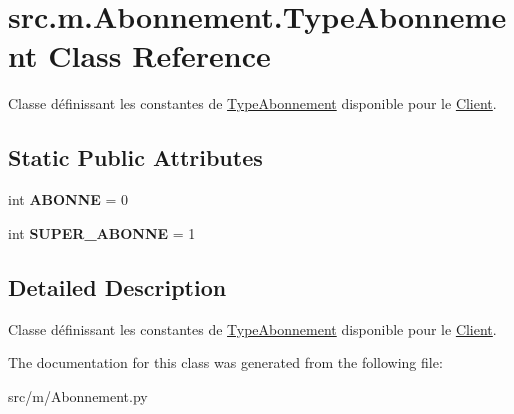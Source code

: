 \hypertarget{classsrc_1_1m_1_1_abonnement_1_1_type_abonnement}{}\section{src.\+m.\+Abonnement.\+Type\+Abonnement Class Reference}
\label{classsrc_1_1m_1_1_abonnement_1_1_type_abonnement}


Classe définissant les constantes de \hyperlink{classsrc_1_1m_1_1_abonnement_1_1_type_abonnement}{Type\+Abonnement} disponible pour le \hyperlink{classsrc_1_1m_1_1_abonnement_1_1_client}{Client}.  


\subsection*{Static Public Attributes}
\begin{DoxyCompactItemize}
\item 
\hypertarget{classsrc_1_1m_1_1_abonnement_1_1_type_abonnement_ae48f82e9e90e1da9ae7930745ecf6580}{}int {\bfseries A\+B\+O\+N\+N\+E} = 0\label{classsrc_1_1m_1_1_abonnement_1_1_type_abonnement_ae48f82e9e90e1da9ae7930745ecf6580}

\item 
\hypertarget{classsrc_1_1m_1_1_abonnement_1_1_type_abonnement_ae3183f23ca23bf599c5103c62970d950}{}int {\bfseries S\+U\+P\+E\+R\+\_\+\+A\+B\+O\+N\+N\+E} = 1\label{classsrc_1_1m_1_1_abonnement_1_1_type_abonnement_ae3183f23ca23bf599c5103c62970d950}

\end{DoxyCompactItemize}


\subsection{Detailed Description}
Classe définissant les constantes de \hyperlink{classsrc_1_1m_1_1_abonnement_1_1_type_abonnement}{Type\+Abonnement} disponible pour le \hyperlink{classsrc_1_1m_1_1_abonnement_1_1_client}{Client}. 

The documentation for this class was generated from the following file\+:\begin{DoxyCompactItemize}
\item 
src/m/Abonnement.\+py\end{DoxyCompactItemize}
